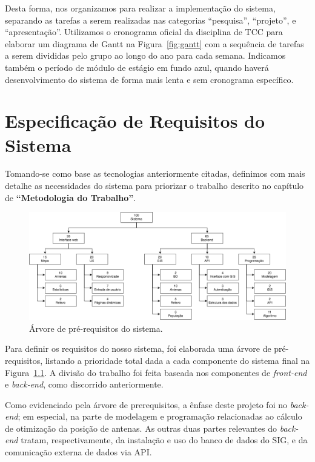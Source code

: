 \documentclass[]{politex}
\begin{document}
Desta forma, nos organizamos para realizar a implementação do sistema, separando
as tarefas a serem realizadas nas categorias ``pesquisa'', ``projeto'', e
``apresentação''. Utilizamos o cronograma oficial da disciplina de TCC para
elaborar um diagrama de Gantt na Figura~\ref{fig:gantt} com a sequência de
tarefas a serem divididas pelo grupo ao longo do ano para cada semana. Indicamos
também o período de módulo de estágio em fundo azul, quando haverá
desenvolvimento do sistema de forma mais lenta e sem cronograma específico.

\chapter{Especificação de Requisitos do Sistema}

Tomando-se como base as tecnologias anteriormente citadas, definimos com mais
detalhe as necessidades do sistema para priorizar o trabalho descrito no
capítulo de \textbf{``Metodologia do Trabalho''}.

\begin{figure}[H]
    \centering
    \includegraphics[width=6in]{imagens/arvore_prerequisitos}
    \caption{Árvore de pré-requisitos do sistema.}
    \label{fig:arvore_prerequisitos}
\end{figure}

Para definir os requisitos do nosso sistema, foi elaborada uma árvore de
pré-requisitos, listando a prioridade total dada a cada componente do sistema
final na Figura~\ref{fig:arvore_prerequisitos}. A divisão do trabalho foi feita
baseada nos componentes de \textit{front-end} e \textit{back-end}, como
discorrido anteriormente.

Como evidenciado pela árvore de prerequisitos, a ênfase deste
projeto foi no \textit{back-end}; em especial, na parte de modelagem e
programação relacionadas ao cálculo de otimização da posição de antenas. As
outras duas partes relevantes do \textit{back-end} tratam, respectivamente, da
instalação e uso do banco de dados do SIG, e da comunicação externa de dados via
API.
\end{document}
